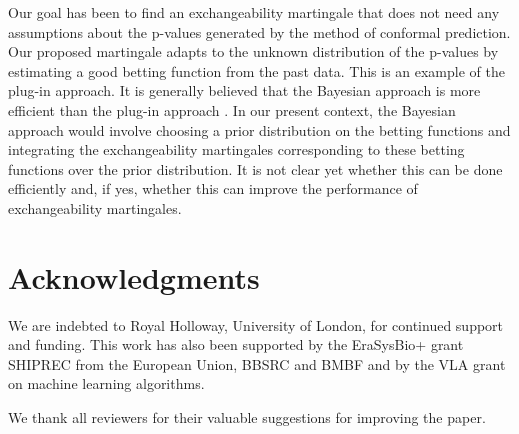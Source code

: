 \documentclass{article}
\theoremstyle{definition}
\begin{document}


Our goal has been to find an exchangeability martingale
that does not need any assumptions about the p-values generated by the method of conformal prediction.
Our proposed martingale adapts to the unknown distribution of the p-values
by estimating a good betting function from the past data.
This is an example of the plug-in approach.
It is generally believed that the Bayesian approach is more efficient
than the plug-in approach \citep[see, e.g.,][p.~483]{bernardo/smith:2000}.
In our present context,
the Bayesian approach would involve choosing a prior distribution on the betting functions
and integrating the exchangeability martingales corresponding to these betting functions
over the prior distribution.
It is not clear yet whether this can be done efficiently and, if yes,
whether this can improve the performance of exchangeability martingales.

\section*{Acknowledgments}
\small{We are indebted to Royal Holloway, University of London,
for continued support and funding.
This work has also been supported by the EraSysBio+ grant SHIPREC
from the European Union, BBSRC and BMBF
and by the VLA grant
on machine learning algorithms.

We thank all reviewers for their valuable suggestions for improving the paper.

}

\ifCONF
  
\fi
\ifnotCONF
  
\fi

\end{document}
